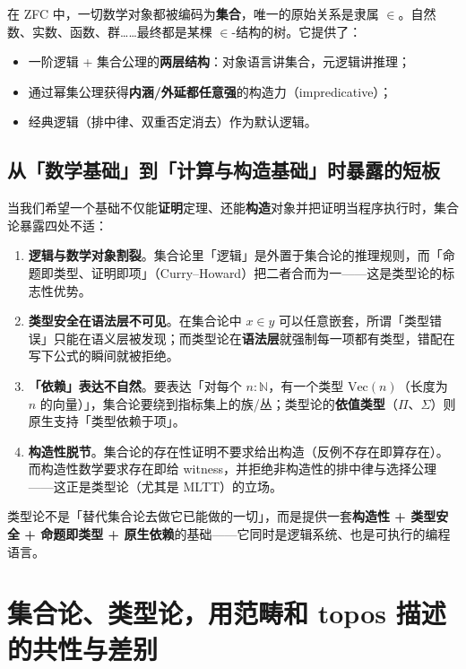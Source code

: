\documentclass[10pt, openany]{book}
\begin{document}
在 ZFC 中，一切数学对象都被编码为\textbf{集合}，唯一的原始关系是隶属 $\in$。自然数、实数、函数、群……最终都是某棵 $\in$-结构的树。它提供了：
\begin{itemize}
  \item 一阶逻辑 + 集合公理的\textbf{两层结构}：对象语言讲集合，元逻辑讲推理；
  \item 通过幂集公理获得\textbf{内涵/外延都任意强}的构造力（impredicative）；
  \item 经典逻辑（排中律、双重否定消去）作为默认逻辑。
\end{itemize}

\subsection{从「数学基础」到「计算与构造基础」时暴露的短板}

当我们希望一个基础不仅能\textbf{证明}定理、还能\textbf{构造}对象并把证明当程序执行时，集合论暴露四处不适：

\begin{enumerate}
  \item \textbf{逻辑与数学对象割裂}。集合论里「逻辑」是外置于集合论的推理规则，而「命题即类型、证明即项」（Curry--Howard）把二者合而为一——这是类型论的标志性优势。
  \item \textbf{类型安全在语法层不可见}。在集合论中 $x\in y$ 可以任意嵌套，所谓「类型错误」只能在语义层被发现；而类型论在\textbf{语法层}就强制每一项都有类型，错配在写下公式的瞬间就被拒绝。
  \item \textbf{「依赖」表达不自然}。要表达「对每个 $n:\mathbb{N}$，有一个类型 $\mathrm{Vec}(n)$（长度为 $n$ 的向量）」，集合论要绕到指标集上的族/丛；类型论的\textbf{依值类型}（$\Pi$、$\Sigma$）则原生支持「类型依赖于项」。
  \item \textbf{构造性脱节}。集合论的存在性证明不要求给出构造（反例不存在即算存在）。而构造性数学要求存在即给 witness，并拒绝非构造性的排中律与选择公理——这正是类型论（尤其是 MLTT）的立场。
\end{enumerate}

\begin{principle}[类型论的定位]
  类型论不是「替代集合论去做它已能做的一切」，而是提供一套\textbf{构造性 + 类型安全 + 命题即类型 + 原生依赖}的基础——它同时是逻辑系统、也是可执行的编程语言。
\end{principle}

\section{集合论、类型论，用范畴和 topos 描述的共性与差别}
\end{document}
